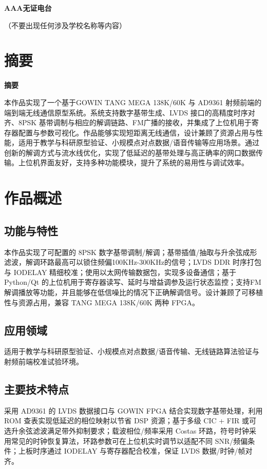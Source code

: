 \documentclass[10pt, a4paper]{article}
\makeatletter
\renewcommand{\abstractname}{\large\textbf{摘要}}
\renewenvironment{abstract}{
    \if@twocolumn
        \section*{\abstractname}
    \else
        \vspace{0.5\baselineskip}\noindent\textbf{\abstractname}\quad\large
    \fi
}{\par}
\makeatother
\begin{document}
\thispagestyle{fancy}

\begin{center}
  \LARGE\textbf{AAA无证电台}

  \vspace{0.5cm}
  \normalsize（不要出现任何涉及学校名称等内容）
\end{center}

\begin{abstract}
    本作品实现了一个基于GOWIN TANG MEGA 138K/60K 与 AD9361 射频前端的端到端无线通信原型系统。系统支持数字基带生成、LVDS 接口的高精度时序对齐、8PSK 基带调制与相应的解调链路、FM广播的接收，并集成了上位机用于寄存器配置与参数可视化。作品能够实现短距离无线通信，设计兼顾了资源占用与性能，适用于教学与科研原型验证、小规模点对点数据/语音传输等应用场景。通过创新的解调方式与流水线优化，实现了低延迟的基带处理与高正确率的网口数据传输。上位机界面友好，支持多种功能模块，提升了系统的易用性与调试效率。
\end{abstract}
\section{作品概述}

\subsection{功能与特性}
本作品实现了可配置的 8PSK 数字基带调制/解调；基带插值/抽取与升余弦成形滤波，解调环路最高可以锁住频偏100KHz-300KHz的信号；LVDS DDR 时序打包与 IODELAY 精细校准；使用以太网传输数据包，实现多设备通信；基于 Python/Qt 的上位机用于寄存器读写、延时与增益调参及运行状态监控；支持FM解调播放等功能，并且能够在低信噪比的情况下正确解调信号。设计兼顾了可移植性与资源占用，兼容 TANG MEGA 138K/60K 两种 FPGA。

\subsection{应用领域}
适用于教学与科研原型验证、小规模点对点数据/语音传输、无线链路算法验证与射频前端校准试验环境。

\subsection{主要技术特点}
采用 AD9361 的 LVDS 数据接口与 GOWIN FPGA 结合实现数字基带处理，利用 ROM 查表实现低延迟的相位映射以节省 DSP 资源；基于多级 CIC + FIR 或可选升余弦滤波满足带外抑制要求；载波相位/频率采用 Costas 环路，符号时钟采用常见的时钟恢复算法，环路参数可在上位机实时调节以适配不同 SNR/频偏条件；上板时序通过 IODELAY 与寄存器配合校准，保证 LVDS 数据/时钟/帧对齐。
\end{document}
